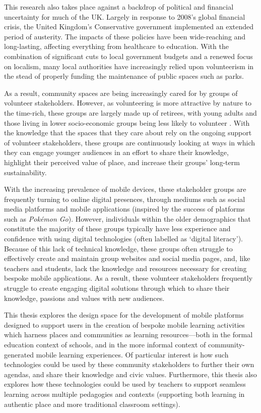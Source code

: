 This research also takes place against a backdrop of political and financial uncertainty for much of the UK. Largely in response to 2008's global financial crisis, the United Kingdom's Conservative government implemented an extended period of austerity. The impacts of these policies have been wide-reaching and long-lasting, affecting everything from healthcare to education. With the combination of significant cuts to local government budgets and a renewed focus on localism, many local authorities have increasingly relied upon volunteerism in the stead of properly funding the maintenance of public spaces such as parks.

As a result, community spaces are being increasingly cared for by groups of volunteer stakeholders. However, as volunteering is more attractive by nature to the time-rich, these groups are largely made up of retirees, with young adults and those living in lower socio-economic groups being less likely to volunteer \citep{ncvo2019}. With the knowledge that the spaces that they care about rely on the ongoing support of volunteer stakeholders, these groups are continuously looking at ways in which they can engage younger audiences in an effort to share their knowledge, highlight their perceived value of place, and increase their groups' long-term sustainability. 

With the increasing prevalence of mobile devices, these stakeholder groups are frequently turning to online digital presences, through mediums such as social media platforms and mobile applications (inspired by the success of platforms such as \textit{Pok\'emon Go}). However, individuals within the older demographics that constitute the majority of these groups typically have less experience and confidence with using digital technologies (often labelled as `digital literacy'). Because of this lack of technical knowledge, these groups often struggle to effectively create and maintain group websites and social media pages, and, like teachers and students, lack the knowledge and resources necessary for creating bespoke mobile applications. As a result, these volunteer stakeholders frequently struggle to create engaging digital solutions through which to share their knowledge, passions and values with new audiences.

This thesis explores the design space for the development of mobile platforms designed to support users in the creation of bespoke mobile learning activities which harness places and communities as learning resources---both in the formal education context of schools, and in the more informal context of community-generated mobile learning experiences. Of particular interest is how such technologies could be used by these community stakeholders to further their own agendas, and share their knowledge and civic values. Furthermore, this thesis also explores how these technologies could be used by teachers to support seamless learning across multiple pedagogies and contexts (supporting both learning in authentic place and more traditional classroom settings).

